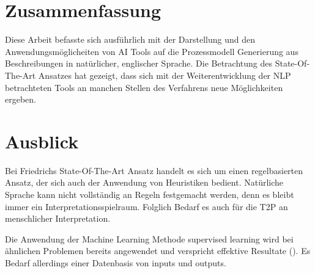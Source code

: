 \section{Zusammenfassung}
Diese Arbeit befasste sich ausführlich mit der Darstellung und den Anwendungsmöglicheiten von \ac{AI} Tools auf die Prozessmodell Generierung aus Beschreibungen in natürlicher, englischer Sprache. 
Die Betrachtung des State-Of-The-Art Ansatzes hat gezeigt, dass sich mit der Weiterentwicklung der \ac{NLP} betrachteten Tools an manchen Stellen des Verfahrens neue Möglichkeiten ergeben.

\section{Ausblick}
Bei Friedrichs State-Of-The-Art Ansatz handelt es sich um einen regelbasierten Ansatz, der sich auch der Anwendung von Heuristiken bedient. Natürliche Sprache kann nicht vollständig an Regeln festgemacht werden, denn es bleibt immer ein Interpretationsspielraum. Folglich Bedarf es auch für die \ac{T2P} an menschlicher Interpretation. \par
Die Anwendung der Machine Learning Methode supervised learning wird bei ähnlichen Problemen bereits angewendet und verspricht effektive Resultate (\cite[vgl.][2]{BPMML}). Es Bedarf allerdings einer Datenbasis von inputs und outputs.